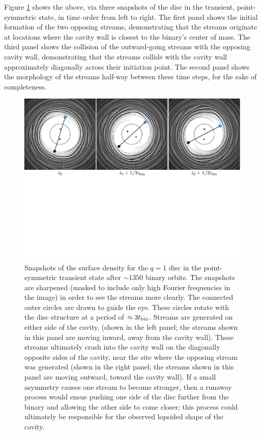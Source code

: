 Figure \ref{Fig:AssymForm} shows the above, via three snapshots of the disc
in the transient, point-symmetric state, in time order from left to
right.  The first panel shows the initial formation of the two
opposing streams, demonstrating that the streams originate at
locations where the cavity wall is closest to the binary's center of
mass. The third panel shows the collision of the outward-going streams
with the opposing cavity wall, demonstrating that the streams collide
with the cavity wall approximately diagonally across their initiation
point.  The second panel shows the morphology of the streams half-way
between these time steps, for the sake of completeness.


\begin{figure}
\begin{center}
\includegraphics[scale=0.4]{figures/ch1/Stream_AsymmMode_3panel.pdf} 
\caption{Snapshots of the surface density for the $q=1$ disc in the
   point-symmetric transient state after $\sim 1350$ binary orbits. The
   snapshots are sharpened (masked to include only high Fourier
   frequencies in the image) in order to see the streams more
   clearly. The connected outer circles are drawn to guide the eye. These
   circles rotate with the disc structure at a period of $\approx 3
   t_{\rm bin}$. Streams are generated on either side of the cavity,
   (shown in the left panel; the streams shown in this panel are moving
   inward, away from the cavity wall).  These streams ultimately crash
   into the cavity wall on the diagonally opposite sides of the cavity,
   near the site where the opposing stream was generated (shown in the
   right panel; the streams shown in this panel are moving outward,
   toward the cavity wall).  If a small asymmetry causes one stream to
   become stronger, then a runaway process would ensue pushing one side
   of the disc further from the binary and allowing the other side to
   come closer; this process could ultimately be responsible for the
   observed lopsided shape of the cavity.}
\label{Fig:AssymForm}
\end{center}
\end{figure}


